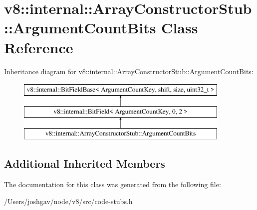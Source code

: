 \hypertarget{classv8_1_1internal_1_1_array_constructor_stub_1_1_argument_count_bits}{}\section{v8\+:\+:internal\+:\+:Array\+Constructor\+Stub\+:\+:Argument\+Count\+Bits Class Reference}
\label{classv8_1_1internal_1_1_array_constructor_stub_1_1_argument_count_bits}
Inheritance diagram for v8\+:\+:internal\+:\+:Array\+Constructor\+Stub\+:\+:Argument\+Count\+Bits\+:\begin{figure}[H]
\begin{center}
\leavevmode
\includegraphics[height=3.000000cm]{classv8_1_1internal_1_1_array_constructor_stub_1_1_argument_count_bits}
\end{center}
\end{figure}
\subsection*{Additional Inherited Members}


The documentation for this class was generated from the following file\+:\begin{DoxyCompactItemize}
\item 
/\+Users/joshgav/node/v8/src/code-\/stubs.\+h\end{DoxyCompactItemize}
